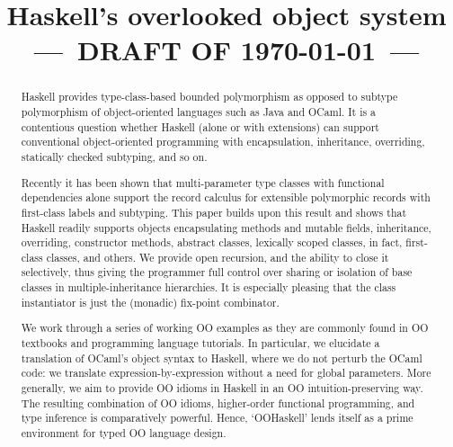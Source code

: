 \documentclass[onecolumn,11pt,preprint]{sigplanconf}
\begin{document}
 
\title{Haskell's overlooked object system\\
{\small ---~DRAFT OF \today~---}\vspace{-77\in}}



\maketitle

\begin{abstract}

Haskell provides type-class-based bounded polymorphism as opposed to
subtype polymorphism of object-oriented languages such as Java and
OCaml. It is a contentious question whether Haskell (alone or with
extensions) can support conventional object-oriented programming with
encapsulation, inheritance, overriding, statically checked subtyping,
and so on.

\medskip

Recently it has been shown that multi-parameter type classes with
functional dependencies alone support the record calculus for
extensible polymorphic records with first-class labels and
subtyping. This paper builds upon this result and shows that Haskell
readily supports objects encapsulating methods and mutable fields,
inheritance, overriding, constructor methods, abstract classes,
lexically scoped classes, in fact, first-class classes, and others. We
provide open recursion, and the ability to close it selectively, thus
giving the programmer full control over sharing or isolation of base
classes in multiple-inheritance hierarchies. It is especially pleasing
that the class instantiator is just the (monadic) fix-point
combinator.

\medskip

We work through a series of working OO examples as they are commonly
found in OO textbooks and programming language tutorials. In
particular, we elucidate a translation of OCaml's object syntax to
Haskell, where we do not perturb the OCaml code: we translate
expression-by-expression without a need for global parameters. More
generally, we aim to provide OO idioms in Haskell in an OO
intuition-preserving way. The resulting combination of OO idioms,
higher-order functional programming, and type inference is
comparatively powerful. Hence, `OOHaskell' lends itself as a prime
environment for typed OO language design.

\end{abstract}
\end{document}
